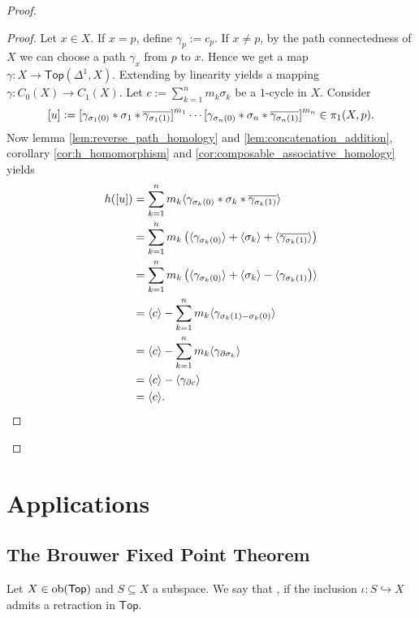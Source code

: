 \begin{proof}
	\begin{proof}
		Let $x \in X$. If $x = p$, define $\gamma_p := c_p$. If $x \neq p$, by the path connectedness of $X$ we can choose a path $\gamma_x$ from $p$ to $x$. Hence we get a map $\gamma : X \to \mathsf{Top}(\Delta^1,X)$. Extending by linearity yields a mapping $\gamma : C_0(X) \to C_1(X)$. Let $c := \sum_{k = 1}^n m_k \sigma_k$ be a $1$-cycle in $X$. Consider
		\begin{equation*}
			\sbr{u} := \sbr[0]{\gamma_{\sigma_1(0)} \ast \sigma_1 \ast \overline{\gamma_{\sigma_1(1)}}}^{m_1} \cdots \sbr[0]{\gamma_{\sigma_n(0)} \ast \sigma_n \ast \overline{\gamma_{\sigma_n(1)}}}^{m_n} \in \pi_1(X,p). 
		\end{equation*}
		Now lemma \ref{lem:reverse_path_homology} and \ref{lem:concatenation_addition}, corollary \ref{cor:h_homomorphism} and \ref{cor:composable_associative_homology} yields
		\begin{align*}
			h(\sbr{u}) &= \sum_{k = 1}^n m_k \langle\gamma_{\sigma_k(0)} \ast \sigma_k \ast \overline{\gamma_{\sigma_k(1)}}\rangle\\
			&= \sum_{k = 1}^n m_k \del[1]{\langle\gamma_{\sigma_k(0)}\rangle + \langle\sigma_k\rangle + \langle \overline{\gamma_{\sigma_k(1)}}\rangle}\\
			&= \sum_{k = 1}^n m_k \del[1]{\langle\gamma_{\sigma_k(0)}\rangle + \langle\sigma_k\rangle - \langle \gamma_{\sigma_k(1)}}\rangle\\
			&= \langle c \rangle - \sum_{k = 1}^n m_k \langle \gamma_{\sigma_k(1) - \sigma_k(0)}\rangle\\
			&= \langle c \rangle - \sum_{k = 1}^n m_k \langle \gamma_{\partial \sigma_k}\rangle\\
			&= \langle c \rangle - \langle \gamma_{\partial c}\rangle\\
			&= \langle c \rangle.
		\end{align*}
	\end{proof}
	
\end{proof}


\section*{Applications}
\subsection*{The Brouwer Fixed Point Theorem}

\begin{definition}[Retract]
	Let $X \in \operatorname{ob}(\mathsf{Top})$ and $S \subseteq X$ a subspace. We say that ,  if the inclusion $\iota : S \hookrightarrow X$ admits a retraction in $\mathsf{Top}$.
\end{definition}

